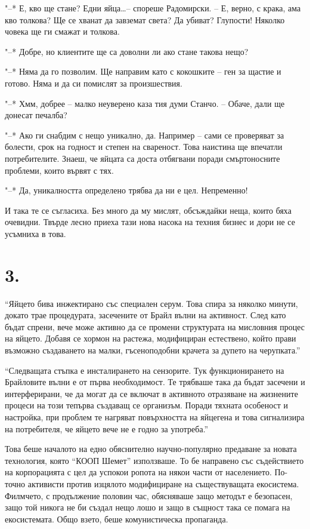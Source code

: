 \documentclass[ebook,openany,12pt]{memoir}
\begin{document}
"--* Е, кво ще стане? Едни яйца\ldots – спореше Радомирски. – Е, верно, с крака, ама кво толкова? Ще се хванат да завземат света? Да убиват? Глупости! Няколко човека ще ги смажат и толкова.

"--* Добре, но клиентите ще са доволни ли ако стане такова нещо?

"--* Няма да го позволим. Ще направим като с кокошките – ген за щастие и готово. Няма и да си помислят за произшествия. 

"--* Хмм, добрее – малко неуверено каза тия думи Станчо. – Обаче, дали ще донесат печалба?

"--* Ако ги снабдим с нещо уникално, да. Например – сами се проверяват за болести, срок на годност и степен на свареност. Това наистина ще впечатли потребителите. Знаеш, че яйцата са доста отбягвани поради смъртоносните проблеми, които вървят с тях.

"--* Да, уникалността определено трябва да ни е цел. Непременно! 

И така те се съгласиха. Без много да му мислят, обсъждайки неща, които бяха очевидни. Твърде лесно приеха тази нова насока на техния бизнес и дори не се усъмниха в това.

\section*{3.}

``Яйцето бива инжектирано със специален серум. Това спира за няколко минути, докато трае процедурата, засечените от Брайл вълни на активност. След като бъдат спрени, вече може активно да се промени структурата на мисловния процес на яйцето. Добавя се хормон на растежа, модифициран естествено, който прави възможно създаването на малки, гъсеноподобни крачета за дупето на черупката.''

``Следващата стъпка е инсталирането на сензорите. Тук функционирането на Брайловите вълни е от първа необходимост. Те трябваше така да бъдат засечени и интерферирани, че да могат да се включат в активното отразяване на жизнените процеси на този тепърва създаващ се организъм. Поради тяхната особеност и настройка, при проблем те нагряват повърхността на яйцегена и това сигнализира на потребителя, че яйцето вече не е годно за употреба.''

Това беше началото на едно обяснително научно-популярно предаване за новата технология, която ``КООП Шемет'' използваше. То бе направено със съдействието на корпорацията с цел да успокои ропота на някои части от населението. По-точно активисти против изцялото модифициране на съществуващата екосистема. Филмчето, с продължение половин час, обясняваше защо методът е безопасен, защо той никога не би създал нещо лошо и защо в същност така се помага на екосистемата. Общо взето, беше комунистическа пропаганда. 
\end{document}
